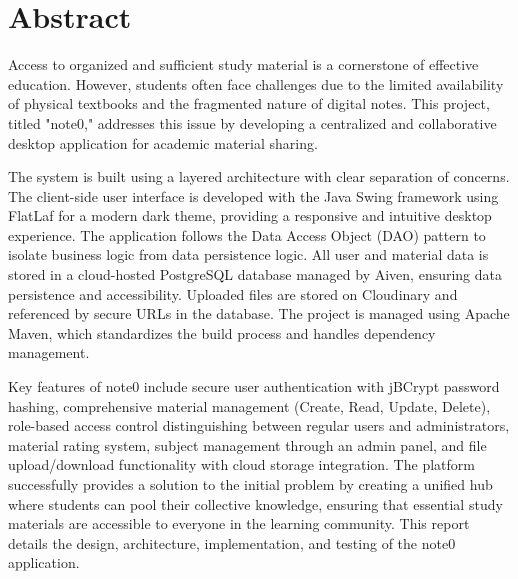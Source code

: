 \documentclass[12pt, a4paper]{report}
\begin{document}
\newpage
\chapter*{Abstract}

Access to organized and sufficient study material is a cornerstone of effective education. However, students often face challenges due to the limited availability of physical textbooks and the fragmented nature of digital notes. This project, titled "note0," addresses this issue by developing a centralized and collaborative desktop application for academic material sharing.

The system is built using a layered architecture with clear separation of concerns. The client-side user interface is developed with the Java Swing framework using FlatLaf for a modern dark theme, providing a responsive and intuitive desktop experience. The application follows the Data Access Object (DAO) pattern to isolate business logic from data persistence logic. All user and material data is stored in a cloud-hosted PostgreSQL database managed by Aiven, ensuring data persistence and accessibility. Uploaded files are stored on Cloudinary and referenced by secure URLs in the database. The project is managed using Apache Maven, which standardizes the build process and handles dependency management.

Key features of note0 include secure user authentication with jBCrypt password hashing, comprehensive material management (Create, Read, Update, Delete), role-based access control distinguishing between regular users and administrators, material rating system, subject management through an admin panel, and file upload/download functionality with cloud storage integration. The platform successfully provides a solution to the initial problem by creating a unified hub where students can pool their collective knowledge, ensuring that essential study materials are accessible to everyone in the learning community. This report details the design, architecture, implementation, and testing of the note0 application.

\newpage


\tableofcontents
\newpage
\listoffigures
\newpage
\listoftables
\newpage
{} %
\end{document}
